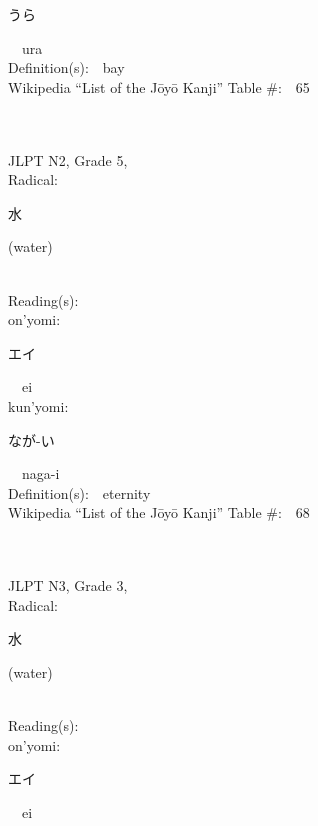 \begin{multicols}{2}
{\hspace*{2em}}{\begin{CJK}{UTF8}{min} うら \end{CJK}}\ \ ura\ \ \\
Definition(s):\ \ bay \\
Wikipedia ``List of the J\=oy\=o Kanji'' Table \#:\ \ 65 \\
\ \ \\
{\fontsize{34pt}{40pt}  }\ \ \\  %
{JLPT N2, Grade 5, \\Radical:\ \ {\begin{CJK}{UTF8}{min} 水 \end{CJK}} (water) } \\
Reading(s):\ \ \\
{\hspace*{1em}}on'yomi:\ \ \\
{\hspace*{2em}}{\begin{CJK}{UTF8}{min} エイ \end{CJK}}\ \ ei\ \ \\
{\hspace*{1em}}kun'yomi:\ \ \\
{\hspace*{2em}}{\begin{CJK}{UTF8}{min} なが-い \end{CJK}}\ \ naga-i\ \ \\
Definition(s):\ \ eternity \\
Wikipedia ``List of the J\=oy\=o Kanji'' Table \#:\ \ 68 \\
\ \ \\
{\fontsize{34pt}{40pt}  }\ \ \\  %
{JLPT N3, Grade 3, \\Radical:\ \ {\begin{CJK}{UTF8}{min} 水 \end{CJK}} (water) } \\
Reading(s):\ \ \\
{\hspace*{1em}}on'yomi:\ \ \\
{\hspace*{2em}}{\begin{CJK}{UTF8}{min} エイ \end{CJK}}\ \ ei\ \ \\

\end{multicols}
